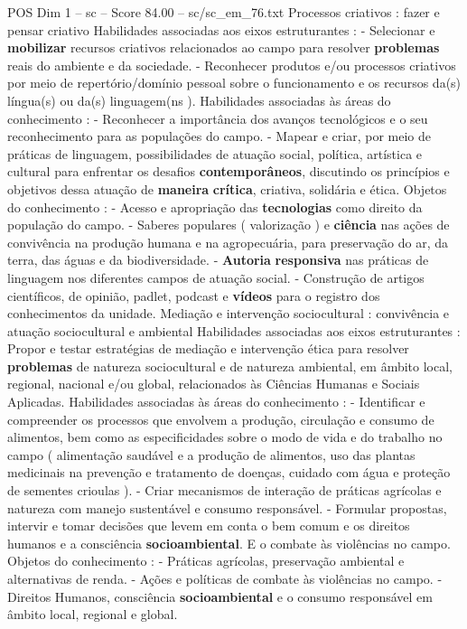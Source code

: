 \begin{textsample}{POS Dim 1 – sc – Score 84.00 – sc/sc\_em\_76.txt}
Processos criativos : fazer e pensar criativo Habilidades associadas aos eixos estruturantes : - Selecionar e \textbf{mobilizar} recursos criativos relacionados ao campo para resolver \textbf{problemas} reais do ambiente e da sociedade. - Reconhecer produtos e/ou processos criativos por meio de repertório/domínio pessoal sobre o funcionamento e os recursos da(s) língua(s) ou da(s) linguagem(ns ).
Habilidades associadas às áreas do conhecimento : - Reconhecer a importância dos avanços tecnológicos e o seu reconhecimento para as populações do campo. - Mapear e criar, por meio de práticas de linguagem, possibilidades de atuação social, política, artística e cultural para enfrentar os desafios \textbf{contemporâneos}, discutindo os princípios e objetivos dessa atuação de \textbf{maneira} \textbf{crítica}, criativa, solidária e ética.
Objetos do conhecimento : - Acesso e apropriação das \textbf{tecnologias} como direito da população do campo. - Saberes populares ( valorização ) e \textbf{ciência} nas ações de convivência na produção humana e na agropecuária, para preservação do ar, da terra, das águas e da biodiversidade. - \textbf{Autoria} \textbf{responsiva} nas práticas de linguagem nos diferentes campos de atuação social. - Construção de artigos científicos, de opinião, padlet, podcast e \textbf{vídeos} para o registro dos conhecimentos da unidade.
Mediação e intervenção sociocultural : convivência e atuação sociocultural e ambiental Habilidades associadas aos eixos estruturantes : Propor e testar estratégias de mediação e intervenção ética para resolver \textbf{problemas} de natureza sociocultural e de natureza ambiental, em âmbito local, regional, nacional e/ou global, relacionados às Ciências Humanas e Sociais Aplicadas.
Habilidades associadas às áreas do conhecimento : - Identificar e compreender os processos que envolvem a produção, circulação e consumo de alimentos, bem como as especificidades sobre o modo de vida e do trabalho no campo ( alimentação saudável e a produção de alimentos, uso das plantas medicinais na prevenção e tratamento de doenças, cuidado com água e proteção de sementes crioulas ). - Criar mecanismos de interação de práticas agrícolas e natureza com manejo sustentável e consumo responsável. - Formular propostas, intervir e tomar decisões que levem em conta o bem comum e os direitos humanos e a consciência \textbf{socioambiental}.
E o combate às violências no campo.
Objetos do conhecimento : - Práticas agrícolas, preservação ambiental e alternativas de renda. - Ações e políticas de combate às violências no campo. - Direitos Humanos, consciência \textbf{socioambiental} e o consumo responsável em âmbito local, regional e global.

\end{textsample}

